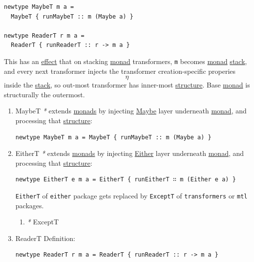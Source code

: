 \documentclass[11pt]{article}
\begin{document}
\begin{enumerate}
\begin{verbatim}
newtype MaybeT m a =
  MaybeT { runMaybeT :: m (Maybe a) }

newtype ReaderT r m a =
  ReaderT { runReaderT :: r -> m a }
\end{verbatim}

This has an \hyperref[org9502b33]{effect} that on stacking \hyperref[org268aaf1]{monad} transformers, \texttt{m} becomes \hyperref[org268aaf1]{monad} \hyperref[org901a5a9]{stack}, and every next transformer injects the transformer creation-specific properies $$ \eta $$ inside the \hyperref[org901a5a9]{stack}, so out-most transformer has inner-most \hyperref[org93ee82c]{structure}. Base \hyperref[org268aaf1]{monad} is structurally the outermost.\\

\begin{enumerate}
\item \label{org52bfc7b}MaybeT
\label{sec:orge016975}
\emph{*} extends \hyperref[org3ecde32]{monads} by injecting \hyperref[orga420584]{Maybe} layer underneath \hyperref[org268aaf1]{monad}, and processing that \hyperref[org93ee82c]{structure}:\\
\begin{verbatim}
newtype MaybeT m a = MaybeT { runMaybeT :: m (Maybe a) }
\end{verbatim}

\item \label{org4c51829}EitherT
\label{sec:orgca21250}
\emph{*} extends \hyperref[org3ecde32]{monads} by injecting \hyperref[orgbc5fdf7]{Either} layer underneath \hyperref[org268aaf1]{monad}, and processing that \hyperref[org93ee82c]{structure}:\\

\begin{verbatim}
newtype EitherT e m a = EitherT { runEitherT ∷ m (Either e a) }
\end{verbatim}

\texttt{EitherT} of \texttt{either} package gets replaced by \texttt{ExceptT} of \texttt{transformers} or \texttt{mtl} packages.\\

\begin{enumerate}
\item \emph{*}
\label{sec:org1d2c8a4}
\label{org4ab0502}ExceptT\\
\end{enumerate}

\item \label{org915a71d}ReaderT
\label{sec:org9770ef8}
Definition:\\
\begin{verbatim}
newtype ReaderT r m a = ReaderT { runReaderT :: r -> m a }
\end{verbatim}


\end{enumerate}
\end{enumerate}
\end{document}
